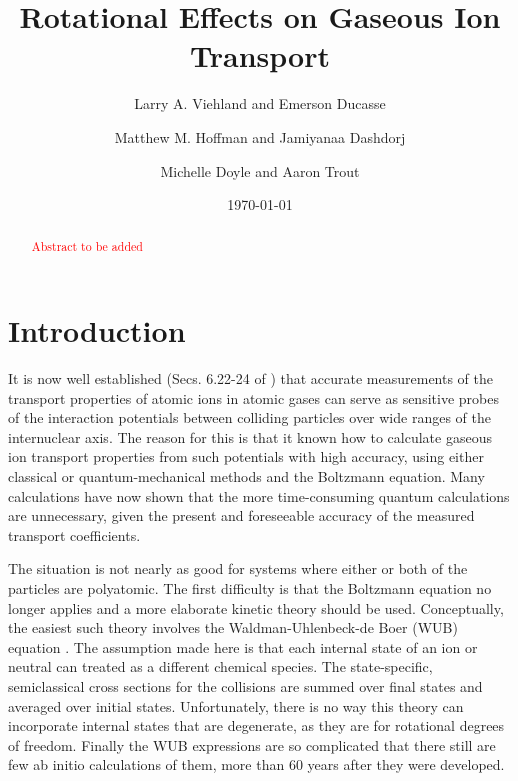 \documentclass[article]{revtex4-2}
\begin{document}
\title{Rotational Effects on Gaseous Ion Transport}
\author{Larry A. Viehland and Emerson Ducasse}
\author{Matthew M. Hoffman and Jamiyanaa Dashdorj}
\author{Michelle Doyle and Aaron Trout}
\date{\today}
\begin{abstract}
    \textcolor{red}{Abstract to be added}
\end{abstract}
\maketitle
\section{Introduction}
It is now well established (Secs. 6.22-24 of \cite{Viehland2018}) that accurate measurements of the transport properties of atomic ions in atomic gases can serve as sensitive probes of the interaction potentials between colliding particles over wide ranges of the internuclear axis.  The reason for this is that it known how to calculate gaseous ion transport properties from such potentials with high accuracy, using either classical or quantum-mechanical methods and the Boltzmann equation. Many calculations have now shown that the more time-consuming quantum calculations are unnecessary, given the present and foreseeable accuracy of the measured transport coefficients.

The situation is not nearly as good for systems where either or both of the particles are polyatomic. The first difficulty is that the Boltzmann equation no longer applies and a more elaborate kinetic theory should be used.  Conceptually, the easiest such theory involves the Waldman-Uhlenbeck-de Boer (WUB) equation \cite{WangChang1964}. The assumption made here is that each internal state of an ion or neutral can treated as a different chemical species. The state-specific, semiclassical cross sections for the collisions are summed over final states and averaged over initial states. Unfortunately, there is no way this theory can incorporate internal states that are degenerate, as they are for rotational degrees of freedom.  Finally the WUB expressions are so complicated that there still are few ab initio calculations of them, more than 60 years after they were developed.
\end{document}

